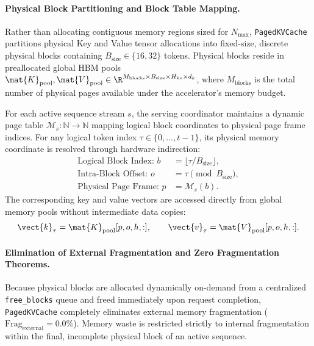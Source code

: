 \paragraph{Physical Block Partitioning and Block Table Mapping.}
Rather than allocating contiguous memory regions sized for $N_{\max}$, \texttt{PagedKVCache} partitions physical Key and Value tensor allocations into fixed-size, discrete physical blocks containing $B_{\text{size}} \in \{16, 32\}$ tokens. Physical blocks reside in preallocated global HBM pools $\mat{K}_{\text{pool}}, \mat{V}_{\text{pool}} \in \R^{M_{\text{blocks}} \times B_{\text{size}} \times H_{\text{kv}} \times d_k}$, where $M_{\text{blocks}}$ is the total number of physical pages available under the accelerator's memory budget.

For each active sequence stream $s$, the serving coordinator maintains a dynamic page table $\mathcal{M}_s: \mathbb{N} \to \mathbb{N}$ mapping logical block coordinates to physical page frame indices. For any logical token index $\tau \in \{0, \dots, t-1\}$, its physical memory coordinate is resolved through hardware indirection:
\begin{align}
\text{Logical Block Index: } b &= \lfloor \tau / B_{\text{size}} \rfloor, \\
\text{Intra-Block Offset: } o &= \tau \pmod{B_{\text{size}}}, \\
\text{Physical Page Frame: } p &= \mathcal{M}_s(b).
\end{align}
The corresponding key and value vectors are accessed directly from global memory pools without intermediate data copies:
\begin{equation}
\vect{k}_\tau = \mat{K}_{\text{pool}}[p, o, h, :], \qquad \vect{v}_\tau = \mat{V}_{\text{pool}}[p, o, h, :].
\end{equation}

\paragraph{Elimination of External Fragmentation and Zero Fragmentation Theorems.}
Because physical blocks are allocated dynamically on-demand from a centralized \texttt{free\_blocks} queue and freed immediately upon request completion, \texttt{PagedKVCache} completely eliminates external memory fragmentation ($\text{Frag}_{\text{external}} = 0.0\%$). Memory waste is restricted strictly to internal fragmentation within the final, incomplete physical block of an active sequence.

